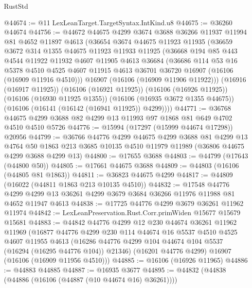 \begin{lexlean}{RustStd}
\begin{coremodule}
@44674 := @11 LexLeanTarget.TargetSyntax.IntKind.u8
@44675 := @36260 @44674
@44756 := @44672
    @44675
    @4299
    @3674
    @3688
    @36266
    @11937
    @11994
    @81
    @4652
    @11897
    @4613
    (@36654
      @3674
      @44675
      @11923
      @11935
      (@36659
        @3672
        @314
        @1355
        @44675
        @11923
        @11933
        @11925
        (@36668
          @194
          @85
          @443
          @4544
          @11922
          @11932
          @4607
          @11905
          @4613
          @36684
          (@36686
            @114
            @53
            @16
            @5378
            @4510
            @4525
            @4607
            @11915
            @4613
            @36701
            @36720
            @16907
            (@16106 (@16909 @11916 @4510)))
          @16907
          (@16106 (@16909 @11906 @11922)))
        (@16916 (@16917 @11925))
        (@16106 (@16921 @11925))
        (@16106 (@16926 @11925))
        (@16106 (@16930 @11925 @1355))
        (@16106 (@16935 @3672 @1355 @44675))
        (@16106 (@16141 (@16142 (@16941 @11925)) @4299))))
@44771 := @36768 @44675 @4299 @3688 @82 @4299 @13 @11993 @97 @1868 @81 @649 @4702 @4510 @4510 @5726
@44776 := @15994 (@17297 (@15999 @44674 @17298)) @20956
@44799 := @36766
    @44776
    @4299
    @44675
    @4299
    @3688
    @81
    @4299
    @13
    @4764
    @50
    @1863
    @213
    @3685
    @10135
    @4510
    @11979
    @11989
    (@36806 @44675 @4299 @3688 @4299 @13)
@44800 := @17655 @3688
@44803 := @44799 (@17643 (@44800 @50))
@44805 := @17661 @44675 @3688
@44809 := @44803 (@16106 (@44805 @81 @1863))
@44811 := @36823 @44675 @4299
@44817 := @44809 (@16022 (@44811 @1863 @213 @10135 @4510))
@44832 := @17548
    @44776
    @4299
    @4299
    @13
    @36261
    @4299
    @3679
    @3684
    @36266
    @11976
    @11988
    @81
    @4652
    @11947
    @4613
@44838 := @17725 @44776 @4299 @3679 @36261 @11962 @11974
@44842 := LexLeanPreservation.Rust.Corr.primWiden @15677 @15679 @15681
@44883 := @44842
    @44776
    @4299
    @12
    @230
    @44674
    @36261
    @11962
    @11969
    (@16877
      @44776
      @4299
      @230
      @114
      @44674
      @16
      @5537
      @4510
      @4525
      @4607
      @11955
      @4613
      (@16286 @44776 @4299 @104 @44674 @104 @5537 (@16294 (@16295 @44776 @104)) @21346)
      (@16201 @44776 @4299)
      @16907
      (@16106 (@16909 @11956 @4510)))
@44885 := @16106 (@16926 @11965)
@44886 := @44883 @44885
@44887 := @16935 @3677
@44895 := @44832 (@44838 (@44886 (@16106 (@44887 (@10 @44674 @16) @36261))))

\end{coremodule}
\end{lexlean}
